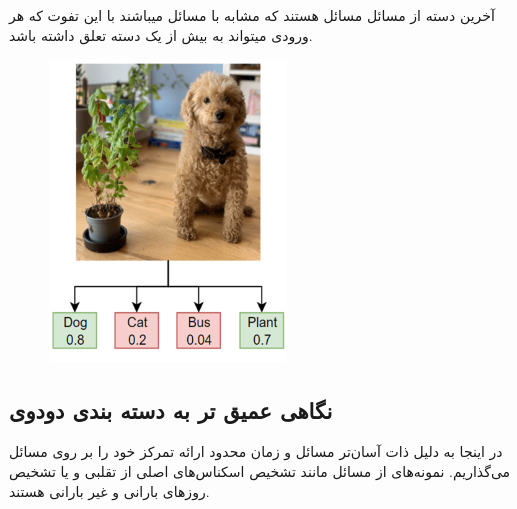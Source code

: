 \documentclass[a4paper, titlepage]{article}
\begin{document}
آخرین دسته از مسائل  مسائل  هستند که مشابه با مسائل  میباشند با این تفوت که هر ورودی میتواند به بیش از یک دسته تعلق داشته باشد.

\begin{figure}[H]
    \center
    \includegraphics[height=8cm]{Classification-img7.png}
    \label{Classification-img7}
    \caption{}
\end{figure}

\subsection{نگاهی عمیق تر به دسته‌ بندی دودوی}

در اینجا به دلیل ذات آسان‌تر مسائل  و زمان محدود ارائه تمرکز خود را بر روی مسائل  می‌گذاریم.
نمونه‌های از مسائل  مانند تشخیص اسکناس‌های اصلی از تقلبی و یا تشخیص روزهای بارانی و غیر بارانی هستند.
\end{document}
